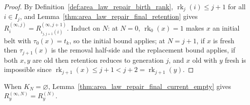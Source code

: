 \begin{proof}
    \leanok
    By Definition~\ref{def:area_law_repair_birth_rank}, $\operatorname{rk}_j(i)\le j+1$ for all
    $i\in I_j$, and Lemma~\ref{thm:area_law_repair_final_retention} gives
    $R_i^{(\infty,j)}=R_{\iota_{j,j+1}(i)}^{(\infty,j+1)}$. Induct on $N$: at $N=0$,
    $\operatorname{rk}_0(x)=1$ makes $x$ an initial belt with $\tau_0(x)=t_k$, so the initial bound
    applies; at $N=j+1$, if $x$ is fresh then $\tau_{j+1}(x)$ is the removal half-side and the
    replacement bound applies, if both $x,y$ are old then retention reduces to generation $j$,
    and $x$ old with $y$ fresh is impossible since $\operatorname{rk}_{j+1}(x)\le j+1<j+2=\operatorname{rk}_{j+1}(y)$.
\end{proof}

When $K_N=\varnothing$, Lemma~\ref{thm:area_law_repair_final_current_empty} gives
$R_y^{(\infty,N)}=R_y^{(N)}$.

